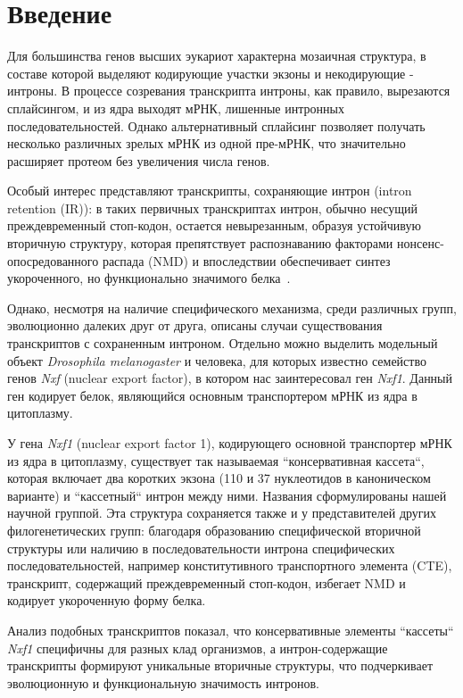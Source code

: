 \clearpage
\section{Введение}

Для большинства генов высших эукариот характерна мозаичная структура, в составе которой выделяют кодирующие участки экзоны и некодирующие - интроны.
В процессе созревания транскрипта интроны, как правило, вырезаются сплайсингом, и из ядра выходят мРНК, лишенные интронных последовательностей.
Однако альтернативный сплайсинг позволяет получать несколько различных зрелых мРНК из одной пре-мРНК, что значительно расширяет протеом без увеличения числа генов.

Особый интерес представляют транскрипты, сохраняющие интрон (intron retention (IR)): в таких первичных транскриптах интрон, обычно несущий преждевременный стоп-кодон, остается невырезанным, образуя устойчивую вторичную структуру, которая препятствует распознаванию факторами нонсенс-опосредованного распада (NMD) и впоследствии обеспечивает синтез укороченного, но функционально значимого белка~\cite{Mamon2019}.

Однако, несмотря на наличие специфического механизма, среди различных групп, эволюционно далеких друг от друга, описаны случаи существования транскриптов с сохраненным интроном.
Отдельно можно выделить модельный объект \textit{Drosophila melanogaster} и человека, для которых известно семейство генов \textit{Nxf} (nuclear export factor), в котором нас заинтересовал ген \textit{Nxf1}.
Данный ген кодирует белок, являющийся основным транспортером мРНК из ядра в цитоплазму.

У гена \textit{Nxf1} (nuclear export factor 1), кодирующего основной транспортер мРНК из ядра в цитоплазму, существует так называемая ``консервативная кассета``, которая включает два коротких экзона (110 и 37 нуклеотидов в каноническом варианте) и ``кассетный`` интрон между ними.
Названия сформулированы нашей научной группой.
Эта структура сохраняется также и у представителей других филогенетических групп: благодаря образованию специфической вторичной структуры или наличию в последовательности интрона специфических последовательностей, например конститутивного транспортного элемента (CTE), транскрипт, содержащий преждевременный стоп-кодон, избегает NMD и кодирует укороченную форму белка.

Анализ подобных транскриптов показал, что консервативные элементы ``кассеты`` \textit{Nxf1} специфичны для разных клад организмов, а интрон-содержащие транскрипты формируют уникальные вторичные структуры, что подчеркивает эволюционную и функциональную значимость интронов.

